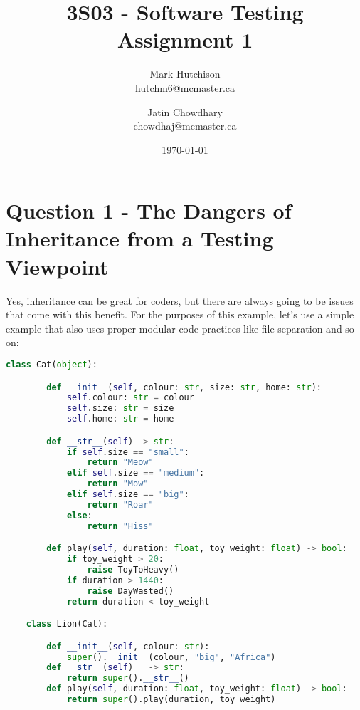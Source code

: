\documentclass{article}
\title{3S03 - Software Testing \\
Assignment 1}
\author{Mark Hutchison \\
hutchm6@mcmaster.ca \and
Jatin Chowdhary \\
chowdhaj@mcmaster.ca}
\date{\today}
\begin{document}
\maketitle

\tableofcontents

\section{Question 1 - The Dangers of Inheritance from a Testing
Viewpoint}

Yes, inheritance can be great for coders, but there are always going
to be issues that come with this benefit. For the purposes of this
example, let's use a simple example that also uses proper modular code
practices like file separation and so on:

\begin{lstlisting}[language=Python]
    class Cat(object):

        def __init__(self, colour: str, size: str, home: str):
            self.colour: str = colour
            self.size: str = size
            self.home: str = home

        def __str__(self) -> str:
            if self.size == "small":
                return "Meow"
            elif self.size == "medium":
                return "Mow"
            elif self.size == "big":
                return "Roar"
            else:
                return "Hiss"

        def play(self, duration: float, toy_weight: float) -> bool:
            if toy_weight > 20:
                raise ToyToHeavy()
            if duration > 1440:
                raise DayWasted()
            return duration < toy_weight

    class Lion(Cat):

        def __init__(self, colour: str):
            super().__init__(colour, "big", "Africa")
        def __str__(self)__ -> str:
            return super().__str__()
        def play(self, duration: float, toy_weight: float) -> bool:
            return super().play(duration, toy_weight)
\end{lstlisting}
\end{document}
